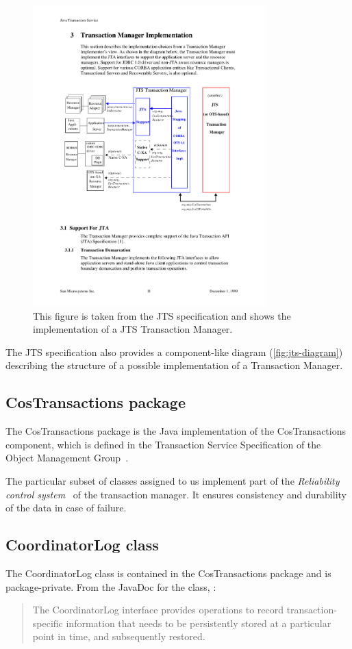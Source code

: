 \begin{figure}
\centering
\includegraphics[width=0.8\textwidth]{figures/JTSDiagram}
\caption{This figure is taken from the JTS specification and shows the implementation of a JTS Transaction Manager.}
\label{fig:jts-diagram}
\end{figure}

The JTS specification also provides a component-like diagram (\autoref{fig:jts-diagram}) describing the structure of a possible implementation of a Transaction Manager.

\subsection{CosTransactions package}
The CosTransactions package is the Java implementation of the CosTransactions component, which is defined in the Transaction Service Specification of the Object Management Group~\cite{omg-ots}.

The particular subset of classes assigned to us implement part of the \emph{Reliability control system}~\cite[p.~311]{ceri-dbbook} of the transaction manager.
It ensures consistency and durability of the data in case of failure.

\subsection{CoordinatorLog class}
The CoordinatorLog class is contained in the CosTransactions package and is package-private. From the JavaDoc for the class, :
\begin{quote}
    The CoordinatorLog interface provides operations to record transaction-specific information that needs to be persistently stored at a particular point in time, and subsequently restored.
\end{quote}

